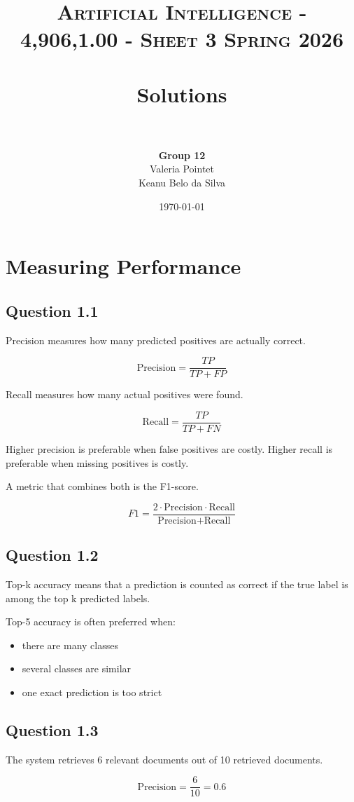 \documentclass[paper=a4, fontsize=11pt]{scrartcl}
\title{
\normalfont \normalsize
\textsc{Artificial Intelligence - 4,906,1.00 - Sheet 3 Spring 2026} \\[10pt]
\horrule{0.5pt} \\[0.4cm]
\huge Solutions \\[-2pt]
\horrule{2pt} \\[0.5cm]
}
\author{
\textbf{Group 12}\\
Valeria Pointet\\
Keanu Belo da Silva
}
\date{\normalsize\today}
\begin{document}
\maketitle

\section{Measuring Performance}

\subsection*{Question 1.1}
Precision measures how many predicted positives are actually correct.

\[
\text{Precision} = \frac{TP}{TP + FP}
\]

Recall measures how many actual positives were found.

\[
\text{Recall} = \frac{TP}{TP + FN}
\]

Higher precision is preferable when false positives are costly.  
Higher recall is preferable when missing positives is costly.

A metric that combines both is the F1-score.

\[
F1 = \frac{2 \cdot \text{Precision} \cdot \text{Recall}}{\text{Precision} + \text{Recall}}
\]

\subsection*{Question 1.2}
Top-k accuracy means that a prediction is counted as correct if the true label is among the top k predicted labels.

Top-5 accuracy is often preferred when:
\begin{itemize}
    \item there are many classes
    \item several classes are similar
    \item one exact prediction is too strict
\end{itemize}

\subsection*{Question 1.3}
The system retrieves 6 relevant documents out of 10 retrieved documents.

\[
\text{Precision} = \frac{6}{10} = 0.6
\]
\end{document}
